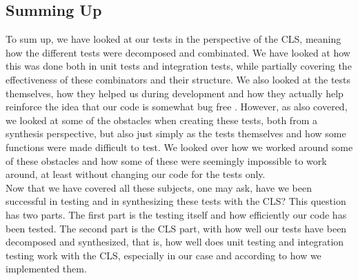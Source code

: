 \subsection{Summing Up}
To sum up, we have looked at our tests in the perspective of the CLS, meaning how the different tests were decomposed and combinated. We have looked at how this was done both in unit tests and integration tests, while partially covering the effectiveness of these combinators and their structure. We also looked at the tests themselves, how they helped us during development and how they actually help reinforce the idea that our code is somewhat bug free . However, as also covered, we looked at some of the obstacles when creating these tests, both from a synthesis perspective, but also just simply as the tests themselves and how some functions were made difficult to test. We looked over how we worked around some of these obstacles and how some of these were seemingly impossible to work around, at least without changing our code for the tests only. \\
Now that we have covered all these subjects, one may ask, have we been successful in testing and in synthesizing these tests with the CLS? This question has two parts. The first part is the testing itself and how efficiently our code has been tested. The second part is the CLS part, with how well our tests have been decomposed and synthesized, that is, how well does unit testing and integration testing work with the CLS, especially in our case and according to how we implemented them. \\
\\
